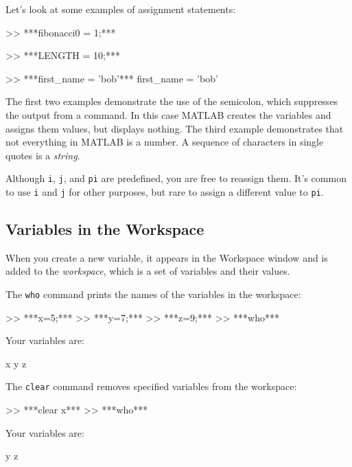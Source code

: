Let's look at some examples of assignment statements:

\begin{code}
>> ***fibonacci0 = 1;***

>> ***LENGTH = 10;***

>> ***first_name = 'bob'***
first_name = 'bob'
\end{code}

The first two examples demonstrate the use of the semicolon, which
suppresses the output from a command.  In this case MATLAB creates the
variables and assigns them values, but displays nothing.
%
%
%
%
The third example demonstrates that not everything
in MATLAB is a number.
A sequence of characters in single quotes is
a \emph{string}.


Although \lstinline{i}, \lstinline{j}, and \lstinline{pi} are predefined, you are free
to reassign them.  It's common to use \lstinline{i} and \lstinline{j} for other
purposes, but rare to assign a different value to
\lstinline{pi}.



\subsection{Variables in the Workspace}

When you create a new variable, it appears in the Workspace window and is added to the \emph{workspace}, which is a
set of variables and their values.


The \lstinline{who} command prints the
names of the variables in the workspace:


\begin{code}
>> ***x=5;***
>> ***y=7;***
>> ***z=9;***
>> ***who***

Your variables are:

x  y  z
\end{code}

The \lstinline{clear} command removes specified variables from the workspace:

\begin{code}
>> ***clear x***
>> ***who***

Your variables are:

y z
\end{code}

